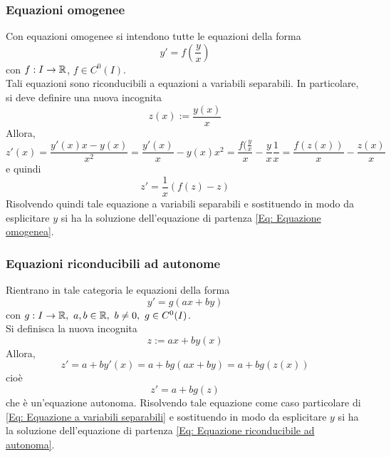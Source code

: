\subsubsection{Equazioni omogenee}
Con equazioni omogenee si intendono tutte le equazioni della forma
\begin{equation}  \label{Eq: Equazione omogenea}
    y'=f\left(\frac{y}{x}\right)
\end{equation}
con $f:I \to \mathbb{R}$, $f \in C^0(I)$.\\
Tali equazioni sono riconducibili a equazioni a variabili separabili. In particolare, si deve definire una nuova incognita
\begin{equation*}
    z(x):=\frac{y(x)}{x} 
\end{equation*}
Allora,
\begin{equation*}
    z'(x)=\frac{y'(x)x-y(x)}{x^2}=\frac{y'(x)}{x}-{y(x)}{x^2}= \frac{f(\tfrac{y}{x}}{x}-\frac{y}{x}\frac{1}{x}=\frac{f(z(x))}{x}-\frac{z(x)}{x}
\end{equation*}
e quindi
\begin{equation*}
    z'=\frac{1}{x}\left(f(z)-z\right)
\end{equation*}
Risolvendo quindi tale equazione a variabili separabili e sostituendo in modo da esplicitare $y$ si ha la soluzione dell'equazione di partenza \eqref{Eq: Equazione omogenea}.
\subsubsection{Equazioni riconducibili ad autonome}
Rientrano in tale categoria le equazioni della forma
\begin{equation} \label{Eq: Equazione riconducibile ad autonoma}
    y'= g(ax+by)
\end{equation}
con $g:I \to \mathbb{R},\ a,b \in \mathbb{R},\ b \neq 0,\ g \in C^0(I)$.\\
Si definisca la nuova incognita 
\begin{equation*}
    z:=ax+by(x)
\end{equation*}
Allora,
\begin{equation*}
    z'=a+by'(x) = a+bg(ax+by)=a+bg(z(x))
\end{equation*}
cioè
\begin{equation*}
    z'=a+bg(z)
\end{equation*}
che è un'equazione autonoma. Risolvendo tale equazione come caso particolare di \eqref{Eq: Equazione a variabili separabili} e sostituendo in modo da esplicitare $y$ si ha la soluzione dell'equazione di partenza \eqref{Eq: Equazione riconducibile ad autonoma}.
